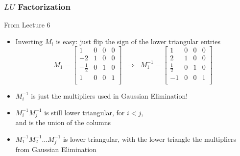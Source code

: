 \documentclass[10pt]{beamer}
\begin{document}
\begin{frame}
\frametitle{$LU$ Factorization}
From Lecture 6
\begin{itemize}
    \item Inverting $M_i$ is easy: just flip the sign of the lower triangular entries
            \[
                M_1 = 
                \begin{bmatrix}
                1 & 0 & 0 & 0\\
                -2 & 1 & 0 & 0\\
                -\frac{1}{2} & 0 & 1 & 0\\
                1 & 0 & 0 & 1\\
                \end{bmatrix}
                \;\;\Rightarrow \;\;
                M_1^{-1} = 
                \begin{bmatrix}
                1 & 0 & 0 & 0\\
                2 & 1 & 0 & 0\\
                \frac{1}{2} & 0 & 1 & 0\\
                -1 & 0 & 0 & 1\\
                \end{bmatrix}
            \]
    \item $M_i^{-1}$ is just the multipliers used in Gaussian Elimination!
    \item $M_i^{-1} M_j^{-1}$ is still lower triangular, for $i < j$, \\
          and is the union of the columns
    \item $M_1^{-1} M_2^{-1}\ldots M_j^{-1}$ is lower triangular, with the lower triangle 
          the multipliers from Gaussian Elimination 
\end{itemize}
\end{frame}
\end{document}
